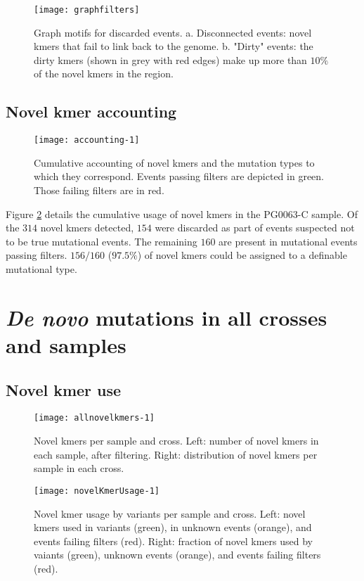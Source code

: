 \begin{figure}[h!]
  \centering
    \texttt{[image: graphfilters]}
  \caption{Graph motifs for discarded events.  a. Disconnected events: novel kmers that fail to link back to the genome.  b. "Dirty" events: the dirty kmers (shown in grey with red edges) make up more than $10\%$ of the novel kmers in the region.}
  \label{fig:graphfilters}
\end{figure}

\subsection{Novel kmer accounting}

\begin{figure}[h!]
  \centering
    \texttt{[image: accounting-1]}
  \caption{Cumulative accounting of novel kmers and the mutation types to which they correspond.  Events passing filters are depicted in green.  Those failing filters are in red.}
  \label{fig:accounting}
\end{figure}

Figure \ref{fig:accounting} details the cumulative usage of novel kmers in the PG0063-C sample.  Of the $314$ novel kmers detected, $154$ were discarded as part of events suspected not to be true mutational events.  The remaining $160$ are present in mutational events passing filters.  $156/160$ ($97.5\%$) of novel kmers could be assigned to a definable mutational type.

\section{\textit{De novo} mutations in all crosses and samples}

\subsection{Novel kmer use}

\begin{figure}[h!]
  \centering
    \texttt{[image: allnovelkmers-1]}
  \caption{Novel kmers per sample and cross.  Left: number of novel kmers in each sample, after filtering.  Right: distribution of novel kmers per sample in each cross.}
  \label{fig:allnovelkmers-1}
\end{figure}

\begin{figure}[h!]
  \centering
    \texttt{[image: novelKmerUsage-1]}
  \caption{Novel kmer usage by variants per sample and cross.  Left: novel kmers used in variants (green), in unknown events (orange), and events failing filters (red).  Right: fraction of novel kmers used by vaiants (green), unknown events (orange), and events failing filters (red).}
  \label{fig:novelKmerUsage-1}
\end{figure}

